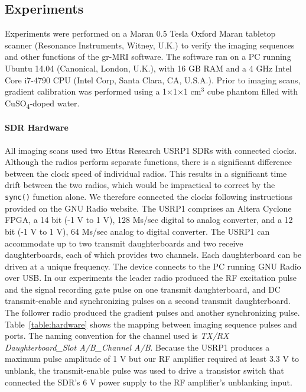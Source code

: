 \documentclass[10pt,letterpaper]{article}
\begin{document}
\subsection*{Experiments}\label{Experiments}
Experiments were performed on a Maran 0.5 Tesla Oxford Maran tabletop scanner (Resonance Instruments, Witney, U.K.)
to verify the imaging sequences and other functions of the gr-MRI software. 
The software ran on a PC running Ubuntu 14.04 (Canonical, London, U.K.), 
with 16 GB RAM and a 4 GHz Intel Core i7-4790 CPU (Intel Corp, Santa Clara, CA, U.S.A.).
Prior to imaging scans, gradient calibration was performed using a
1$\times$1$\times$1 cm$^3$ cube phantom filled with CuSO\textsubscript{4}-doped water.

\paragraph{SDR Hardware}
All imaging scans used two Ettus Research USRP1 SDRs with connected clocks.
Although the radios perform separate functions, there is a significant difference between the clock speed of individual radios.
This results in a significant time drift between the two radios, 
which would be impractical to correct by the \texttt{sync()} function alone.
We therefore connected the clocks following instructions provided on the GNU Radio website.
The USRP1 comprises an Altera Cyclone FPGA,
a 14 bit (-1 V to 1 V), 128 Ms/sec digital to analog converter,
and a 12 bit (-1 V to 1 V), 64 Ms/sec analog to digital converter.
The USRP1 can accommodate up to two transmit daughterboards and two receive daughterboards, 
each of which provides two channels.  
Each daughterboard can be driven at a unique frequency.
The device connects to the PC running GNU Radio over USB.
In our experiments the leader radio produced the RF excitation pulse and the signal recording gate pulse on one transmit daughterboard, 
and DC transmit-enable and synchronizing pulses on a second transmit daughterboard.
The follower radio produced the gradient pulses and another synchronizing pulse.
Table~\ref{table:hardware} shows the mapping between imaging sequence pulses and ports. 
The naming convention for the channel used is \textit{TX/RX Daughterboard\_Slot A/B\_Channel A/B}. 
Because the USRP1 produces a maximum pulse amplitude of 1 V 
but our RF amplifier required at least 3.3 V to unblank,
the transmit-enable pulse was used to drive a transistor switch that connected the SDR's 6 V power supply to the RF amplifier's unblanking input.
\end{document}
